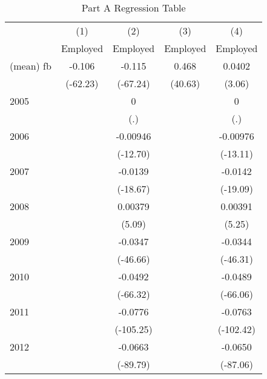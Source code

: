 \begin{table}[htbp]\centering
\caption{Part A Regression Table\label{tab1}}
\begin{tabular}{l*{4}{c}}
\hline\hline
                    &\multicolumn{1}{c}{(1)}&\multicolumn{1}{c}{(2)}&\multicolumn{1}{c}{(3)}&\multicolumn{1}{c}{(4)}\\
                    &\multicolumn{1}{c}{Employed}&\multicolumn{1}{c}{Employed}&\multicolumn{1}{c}{Employed}&\multicolumn{1}{c}{Employed}\\
\hline
(mean) fb           &      -0.106&      -0.115&       0.468&      0.0402\\
                    &    (-62.23)&    (-67.24)&     (40.63)&      (3.06)\\
[1em]
2005                &            &           0&            &           0\\
                    &            &         (.)&            &         (.)\\
[1em]
2006                &            &    -0.00946&            &    -0.00976\\
                    &            &    (-12.70)&            &    (-13.11)\\
[1em]
2007                &            &     -0.0139&            &     -0.0142\\
                    &            &    (-18.67)&            &    (-19.09)\\
[1em]
2008                &            &     0.00379&            &     0.00391\\
                    &            &      (5.09)&            &      (5.25)\\
[1em]
2009                &            &     -0.0347&            &     -0.0344\\
                    &            &    (-46.66)&            &    (-46.31)\\
[1em]
2010                &            &     -0.0492&            &     -0.0489\\
                    &            &    (-66.32)&            &    (-66.06)\\
[1em]
2011                &            &     -0.0776&            &     -0.0763\\
                    &            &   (-105.25)&            &   (-102.42)\\
[1em]
2012                &            &     -0.0663&            &     -0.0650\\
                    &            &    (-89.79)&            &    (-87.06)\\

\end{tabular}
\end{table}
